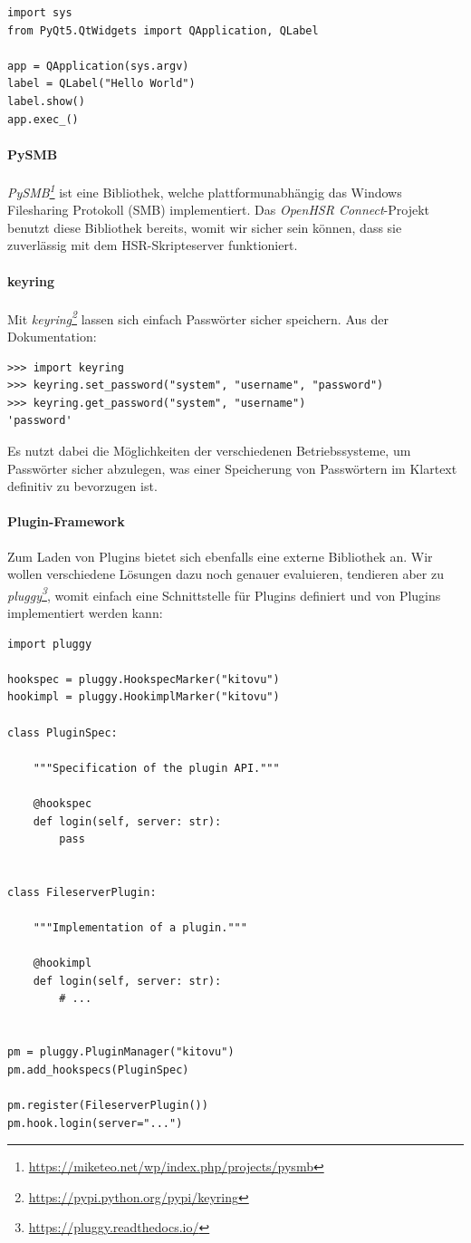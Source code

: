 \documentclass[a4paper]{article}
\newcommand{\tool}[2]{\emph{#1\footnote{\url{#2}}}}
\begin{document}
\begin{verbatim}
import sys
from PyQt5.QtWidgets import QApplication, QLabel

app = QApplication(sys.argv)
label = QLabel("Hello World")
label.show()
app.exec_()
\end{verbatim}

\paragraph{PySMB}

\tool{PySMB}{https://miketeo.net/wp/index.php/projects/pysmb} ist eine
Bibliothek, welche plattformunabhängig das Windows Filesharing Protokoll (SMB)
implementiert. Das \emph{OpenHSR Connect}-Projekt benutzt diese Bibliothek
bereits, womit wir sicher sein können, dass sie zuverlässig mit dem
HSR-Skripteserver funktioniert.

\paragraph{keyring}

Mit \tool{keyring}{https://pypi.python.org/pypi/keyring} lassen sich einfach
Passwörter sicher speichern. Aus der Dokumentation:

\begin{verbatim}
>>> import keyring
>>> keyring.set_password("system", "username", "password")
>>> keyring.get_password("system", "username")
'password'
\end{verbatim}

Es nutzt dabei die Möglichkeiten der verschiedenen Betriebssysteme, um Passwörter sicher abzulegen, was einer Speicherung von Passwörtern im Klartext definitiv zu bevorzugen ist.

\paragraph{Plugin-Framework}

Zum Laden von Plugins bietet sich ebenfalls eine externe Bibliothek an. Wir
wollen verschiedene Lösungen dazu noch genauer evaluieren, tendieren aber zu
\tool{pluggy}{https://pluggy.readthedocs.io/}, womit einfach eine Schnittstelle
für Plugins definiert und von Plugins implementiert werden kann:

\begin{verbatim}
import pluggy

hookspec = pluggy.HookspecMarker("kitovu")
hookimpl = pluggy.HookimplMarker("kitovu")

class PluginSpec:

    """Specification of the plugin API."""

    @hookspec
    def login(self, server: str):
        pass


class FileserverPlugin:

    """Implementation of a plugin."""

    @hookimpl
    def login(self, server: str):
        # ...


pm = pluggy.PluginManager("kitovu")
pm.add_hookspecs(PluginSpec)

pm.register(FileserverPlugin())
pm.hook.login(server="...")
\end{verbatim}
\end{document}
